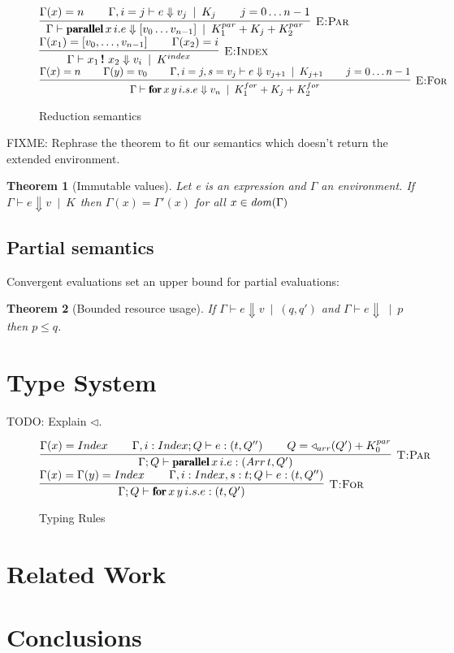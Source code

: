 \documentclass[natbib]{sigplanconf}
\newcommand{\kw}[1]{\mbox{\fontfamily{cmr}\fontseries{b}\selectfont#1}}
\newtheorem{theorem}{Theorem}[section]
\newcommand{\hinfer}[3]{\vcenter{\infer[\DT{#1}]{#2}{#3}}}
\newcommand{\ENV}{\Gamma}
\newcommand{\beval}{\Downarrow} %
\newcommand{\ent}{\vdash}
\newcommand{\cost}{\alt}
\newcommand{\nl}{\vspace{2.5ex} \\}
\newcommand{\spc}{\hspace{5ex}}
\newcommand{\shift}{\triangleleft}
\DeclareMathOperator{\dom}{\it dom}
\newcommand{\DT}[1]{\mbox{\sc #1}}
\newcommand{\alt}{\;\:\vert\;\:}
\newcommand{\KPAR}[1]{K^{par}_{#1}}
\newcommand{\KFOR}[1]{K^{for}_{#1}}
\newcommand{\KINDEX}{K^{index}}
\newcommand{\K}[1]{K_{#1}}
\newcommand{\KADD}{+} %
\newcommand{\PARALLEL}{\kw{parallel}\,}
\newcommand{\FOR}{\kw{for}\,}
\newcommand{\INDEX}{\,\kw{!}\,\,}
\newcommand{\ARRAY}[1]{[#1]}
\newcommand{\TINDEX}{Index}
\newcommand{\TARRAY}{Arr\,}
\newcommand{\TENV}{\Gamma} %
\begin{document}
\begin{figure*}
$\hinfer{E:Par}{\ENV \ent \PARALLEL x\,i.e \beval \ARRAY{v_0\ldots v_{n-1}} \cost \KPAR{1} \KADD \K{j} \KADD \KPAR{2}}{\ENV(x) = n \spc \ENV,i = j \ent e \beval v_j \cost \K{j} \spc j=0\ldots n-1}$ \spc
$\hinfer{E:Index}{\ENV \ent x_1 \INDEX x_2 \beval v_i \cost \KINDEX}{\ENV(x_1) = \ARRAY{v_0,\ldots,v_{n-1}} \spc \ENV(x_2) = i}$ \nl

$\hinfer{E:For}{\ENV \ent \FOR x\,y\, i.s.e \beval v_n \cost \KFOR{1} \KADD \K{j} \KADD \KFOR{2}}{\ENV(x) = n \spc \ENV(y) = v_0 \spc \ENV,i = j, s = v_j \ent e \beval v_{j+1} \cost \K{j+1} \spc j=0\ldots n-1}$
\caption{Reduction semantics}
\label{fig:redsem}
\end{figure*}


FIXME: Rephrase the theorem to fit our semantics which doesn't return the
extended environment.

\begin{theorem}[Immutable values]
Let {\it e} is an expression and $\ENV$ an environment. If $\ENV \ent e \beval v \cost \K{}$ then $\ENV(x) = \ENV'(x)$ for all $x \in \dom(\ENV)$
\end{theorem}


\subsection{Partial semantics}

Convergent evaluations set an upper bound for partial evaluations:
\begin{theorem}[Bounded resource usage]
If $\ENV \ent e \beval v \cost (q, q')$  and $\ENV \ent e \beval \cost p$ 
then $p \leq q$.
\end{theorem}



\section{Type System}

TODO: Explain $\shift$.


\begin{figure*}
$\hinfer{T:Par}{\TENV; Q \ent \PARALLEL x\,i.e : (\TARRAY t, Q')}{\TENV(x) = \TINDEX \spc \TENV,i : \TINDEX; Q \ent e : (t, Q'') \spc Q = \shift_{arr}(Q') + \KPAR{0}}$ \nl

$\hinfer{T:For}{\TENV; Q \ent \FOR x\,y\, i.s.e : (t, Q')}{\TENV(x) = \TENV(y) = \TINDEX \spc \TENV,i:\TINDEX, s:t; Q \ent e : (t, Q'')}$
\caption{Typing Rules}
\label{fig:typesyst}
\end{figure*}

\section{Related Work}

\section{Conclusions}

\acks





\end{document}
